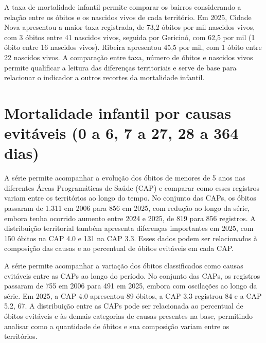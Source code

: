 A taxa de mortalidade infantil permite comparar os bairros considerando a relação entre os óbitos e os nascidos vivos de cada território. Em 2025, Cidade Nova apresentou a maior taxa registrada, de 73,2 óbitos por mil nascidos vivos, com 3 óbitos entre 41 nascidos vivos, seguida por Gericinó, com 62,5 por mil (1 óbito entre 16 nascidos vivos). Ribeira apresentou 45,5 por mil, com 1 óbito entre 22 nascidos vivos. A comparação entre taxa, número de óbitos e nascidos vivos permite qualificar a leitura das diferenças territoriais e serve de base para relacionar o indicador a outros recortes da mortalidade infantil.


\section{Mortalidade infantil por causas evitáveis (0 a 6, 7 a 27, 28 a 364 dias)}


A série permite acompanhar a evolução dos óbitos de menores de 5 anos nas diferentes Áreas Programáticas de Saúde (CAP) e comparar como esses registros variam entre os territórios ao longo do tempo. No conjunto das CAPs, os óbitos passaram de 1.311 em 2006 para 856 em 2025, com redução ao longo da série, embora tenha ocorrido aumento entre 2024 e 2025, de 819 para 856 registros. A distribuição territorial também apresenta diferenças importantes em 2025, com 150 óbitos na CAP 4.0 e 131 na CAP 3.3. Esses dados podem ser relacionados à composição das causas e ao percentual de óbitos evitáveis em cada CAP.


A série permite acompanhar a variação dos óbitos classificados como causas evitáveis entre as CAPs ao longo do período. No conjunto das CAPs, os registros passaram de 755 em 2006 para 491 em 2025, embora com oscilações ao longo da série. Em 2025, a CAP 4.0 apresentou 89 óbitos, a CAP 3.3 registrou 84 e a CAP 5.2, 67. A distribuição entre as CAPs pode ser relacionada ao percentual de óbitos evitáveis e às demais categorias de causas presentes na base, permitindo analisar como a quantidade de óbitos e sua composição variam entre os territórios.

